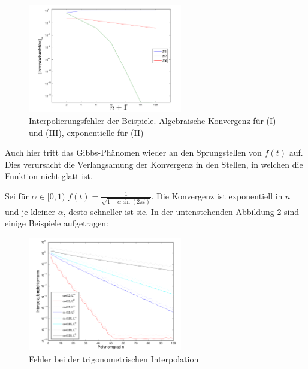 \begin{figure}[h!]
    \begin{center}
        \includegraphics[width=0.6\textwidth]{assets/01_interpolation/01_trigonometric/interpolation-error-examples.png}
    \end{center}
    \caption{Interpolierungsfehler der Beispiele. Algebraische Konvergenz für (I) und (III), exponentielle für (II)}
    \label{fig:interpolation-error-examples}
\end{figure}
Auch hier tritt das Gibbs-Phänomen wieder an den Sprungstellen von $f(t)$ auf.
Dies verursacht die Verlangsamung der Konvergenz in den Stellen, in welchen die Funktion nicht glatt ist.

\newpage
{}
\inlineex Sei für $\alpha \in [0, 1)$ $\displaystyle f(t) = \frac{1}{\sqrt{1 - \alpha \sin(2\pi t)}}$.
Die Konvergenz ist exponentiell in $n$ und je kleiner $\alpha$, desto schneller ist sie.
In der untenstehenden Abbildung \ref{fig:interpolation-error-convergence} sind einige Beispiele aufgetragen:
\begin{figure}[h!]
    \begin{center}
        \includegraphics[width=0.6\textwidth]{assets/01_interpolation/01_trigonometric/interpolation-error-convergence.png}
    \end{center}
    \caption{Fehler bei der trigonometrischen Interpolation}\label{fig:interpolation-error-convergence}
\end{figure}


